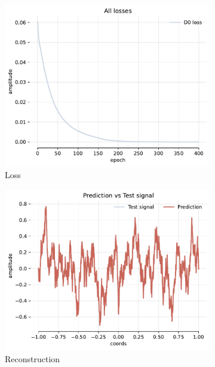 \begin{figure}[h]
    \centering
    \begin{subfigure}[b]{0.32\textwidth}
        \centering
        \includegraphics[width=\textwidth]{img/ch4/loss-noise-hf4096-w512.pdf}
        \caption{Loss}
    \end{subfigure}
    \begin{subfigure}[b]{0.32\textwidth}
        \centering
        \includegraphics[width=\textwidth]{img/ch4/pred-noise-hf4096-w512.pdf}
        \caption{Reconstruction}
    \end{subfigure}
    \begin{subfigure}[b]{0.32\textwidth}

\end{subfigure}
\end{figure}
